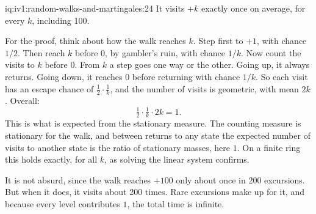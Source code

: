 \begin{solution}{iq:iv1:random-walks-and-martingales:24}
It visits $+k$ exactly once on average, for every $k$, including 100.

For the proof, think about how the walk reaches $k$. Step first to $+1$, with chance $1/2$. Then reach $k$ before 0, by gambler's ruin, with chance $1/k$. Now count the visits to $k$ before 0. From $k$ a step goes one way or the other. Going up, it always returns. Going down, it reaches 0 before returning with chance $1/k$. So each visit has an escape chance of $\tfrac12 \cdot \tfrac1k$, and the number of visits is geometric, with mean $2k$. Overall:
\[
\tfrac12 \cdot \tfrac1k \cdot 2k = 1.
\]
This is what is expected from the stationary measure. The counting measure is stationary for the walk, and between returns to any state the expected number of visits to another state is the ratio of stationary masses, here $1$. On a finite ring this holds exactly, for all $k$, as solving the linear system confirms.

It is not absurd, since the walk reaches $+100$ only about once in 200 excursions. But when it does, it visits about 200 times. Rare excursions make up for it, and because every level contributes $1$, the total time is infinite.

\end{solution}


